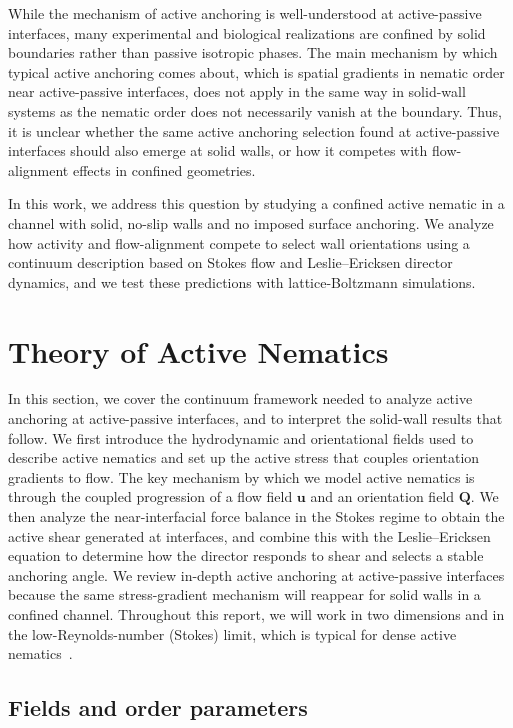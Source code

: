\documentclass[11pt]{article}
\begin{document}
While the mechanism of active anchoring is well-understood at active-passive interfaces, many experimental and biological realizations are confined by solid boundaries rather than passive isotropic phases. The main mechanism by which typical active anchoring comes about, which is spatial gradients in nematic order near active-passive interfaces, does not apply in the same way in solid-wall systems as the nematic order does not necessarily vanish at the boundary. Thus, it is unclear whether the same active anchoring selection found at active-passive interfaces should also emerge at solid walls, or how it competes with flow-alignment effects in confined geometries. 

In this work, we address this question by studying a confined active nematic in a channel with solid, no-slip walls and no imposed surface anchoring. We analyze how activity and flow-alignment compete to select wall orientations using a continuum description based on Stokes flow and Leslie--Ericksen director dynamics, and we test these predictions with lattice-Boltzmann simulations.

\section{Theory of Active Nematics}

In this section, we cover the continuum framework needed to analyze active anchoring at active-passive interfaces, and to interpret the solid-wall results that follow. We first introduce the hydrodynamic and orientational fields used to describe active nematics and set up the active stress that couples orientation gradients to flow. The key mechanism by which we model active nematics is through the coupled progression of a flow field $\mathbf{u}$ and an orientation field $\mathbf{Q}$. We then analyze the near-interfacial force balance in the Stokes regime to obtain the active shear generated at interfaces, and combine this with the Leslie--Ericksen equation to determine how the director responds to shear and selects a stable anchoring angle. We review in-depth active anchoring at active-passive interfaces because the same stress-gradient mechanism will reappear for solid walls in a confined channel. Throughout this report, we will work in two dimensions and in the low-Reynolds-number (Stokes) limit, which is typical for dense active nematics~\cite{yeomans2025active,doostmohammadi2018active}. 

\subsection{Fields and order parameters}
\label{sec:fields_and_order_parameters}
\end{document}
